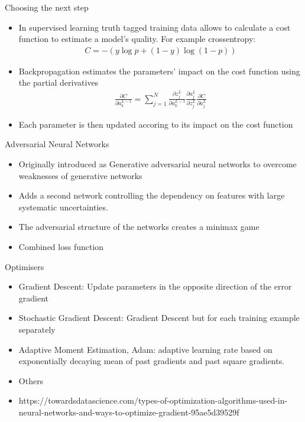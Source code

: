 \begin{frame}{Choosing the next step}
    \begin{itemize}
        \item In supervised learning truth tagged training data allows to calculate a cost function to estimate a model's quality. For example crossentropy:
        \begin{align}
            C = -(y \log p + (1 - y) \log (1 - p) )
            \label{eq:binary_crossentropy}
        \end{align}
        \item Backpropagation estimates the parameters' impact on the cost function using the partial derivatives
        \begin{align*}
            \frac{\partial C}{\partial a_k^{L-1}} = \sum_{j=1}^N \frac{\partial z_j^L}{\partial a_k^{L-1}} \frac{\partial a_j^L}{\partial z_j^L}\frac{\partial C}{\partial a_j^L}
        \end{align*}
        \item Each parameter is then updated accoring to its impact on the cost function
    \end{itemize}
\end{frame}


\begin{frame}{Adversarial Neural Networks}
    \begin{itemize}
        \item Originally introduced as Generative adversarial neural networks to overcome weaknesses of generative networks \cite{2014arXiv1406.2661G}
        \item Adds a second network controlling the dependency on features with large systematic uncertainties. 
        \item The adversarial structure of the networks creates a minimax game
        \item Combined loss function
    \end{itemize}
\end{frame}

\begin{frame}{Optimisers}
\begin{itemize}
    \item Gradient Descent: Update parameters in the opposite direction of the error gradient
    \item Stochastic Gradient Descent: Gradient Descent but for each training example separately
    \item Adaptive Moment Estimation, Adam: adaptive learning rate based on exponentially decaying mean of past gradients and past square gradients.
    \item Others
    \item https://towardsdatascience.com/types-of-optimization-algorithms-used-in-neural-networks-and-ways-to-optimize-gradient-95ae5d39529f
\end{itemize}
    
\end{frame}



